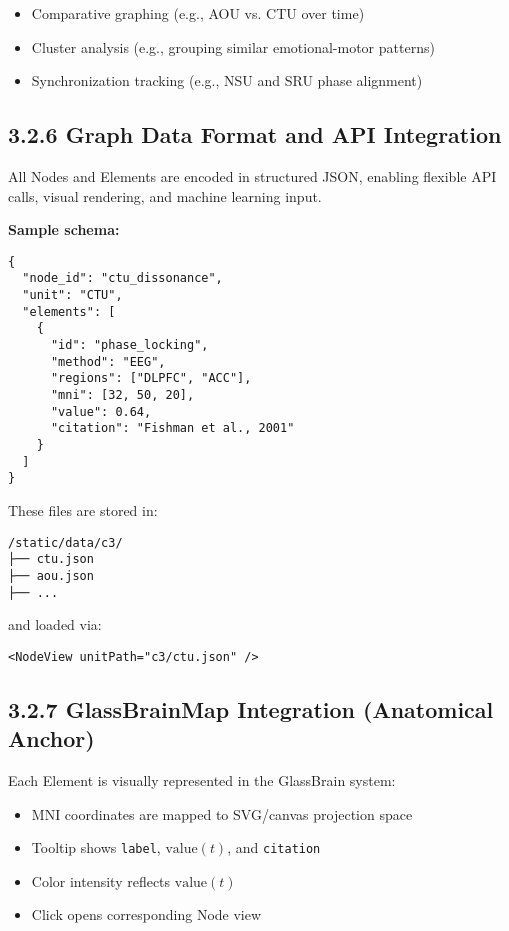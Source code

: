 \documentclass[10pt]{article}
\begin{document}
\begin{itemize}
    \item Comparative graphing (e.g., AOU vs. CTU over time)
    \item Cluster analysis (e.g., grouping similar emotional-motor patterns)
    \item Synchronization tracking (e.g., NSU and SRU phase alignment)
\end{itemize}

\subsection*{3.2.6 Graph Data Format and API Integration}

All Nodes and Elements are encoded in structured JSON, enabling flexible API calls, visual rendering, and machine learning input.

\textbf{Sample schema:}

\begin{verbatim}
{
  "node_id": "ctu_dissonance",
  "unit": "CTU",
  "elements": [
    {
      "id": "phase_locking",
      "method": "EEG",
      "regions": ["DLPFC", "ACC"],
      "mni": [32, 50, 20],
      "value": 0.64,
      "citation": "Fishman et al., 2001"
    }
  ]
}
\end{verbatim}

These files are stored in:

\begin{verbatim}
/static/data/c3/
├── ctu.json
├── aou.json
├── ...
\end{verbatim}

and loaded via:

\begin{verbatim}
<NodeView unitPath="c3/ctu.json" />
\end{verbatim}

\subsection*{3.2.7 GlassBrainMap Integration (Anatomical Anchor)}

Each Element is visually represented in the GlassBrain system:

\begin{itemize}
    \item MNI coordinates are mapped to SVG/canvas projection space
    \item Tooltip shows \texttt{label}, $\text{value}(t)$, and \texttt{citation}
    \item Color intensity reflects $\text{value}(t)$
    \item Click opens corresponding Node view
\end{itemize}
\end{document}
